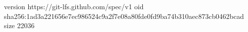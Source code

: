 version https://git-lfs.github.com/spec/v1
oid sha256:1ad3a221656e7ec986524c9a2f7e08a80fde0fd9ba74b310aec873cb0462bcad
size 22036
